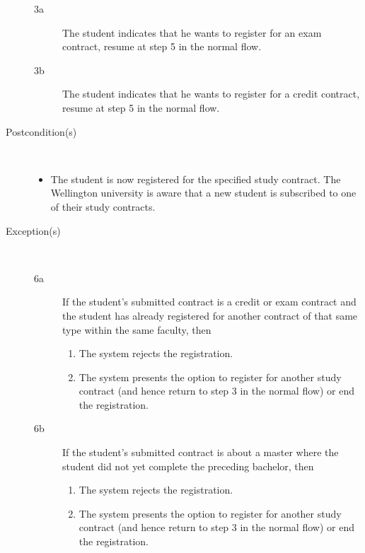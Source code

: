 \begin{description}
	\begin{description}
		\item[3a] The student indicates that he wants to register for an exam
		contract, resume at step 5 in the normal flow.
		\item[3b] The student indicates that he wants to register for a credit
		contract, resume at step 5 in the normal flow.
	\end{description}
	\item[Postcondition(s)] \ 
	\begin{itemize}
		\item The student is now registered for the specified study contract. The
		Wellington university is aware that a new student is subscribed to one of
		their study contracts.
	\end{itemize}
	\item[Exception(s)] \ 
	\begin{description}
		\item[6a] If the student's submitted contract is a credit or exam contract and
		the student has already registered for another contract of that same type
		within the same faculty, then
		\begin{enumerate}
		  \item The system rejects the registration.
		  \item The system presents the option to register for another study contract
		  (and hence return to step 3 in the normal flow) or end the registration.
		\end{enumerate}
		\item[6b] If the student's submitted contract is about a master where the
		student did not yet complete the preceding bachelor, then
		\begin{enumerate}
		 	\item The system rejects the registration.
		 	\item The system presents the option to register for another study contract
		 	(and hence return to step 3 in the normal flow) or end the registration.
		\end{enumerate}
	\end{description}
\end{description}
